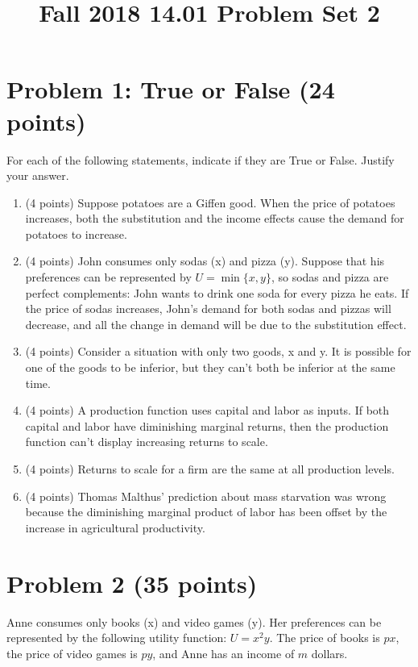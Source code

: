 \documentclass{article}
\begin{document}
\title{Fall 2018 14.01 Problem Set 2}
\maketitle

\section*{Problem 1: True or False (24 points)}
For each of the following statements, indicate if they are True or False. Justify your answer. 

\begin{enumerate}
    \item (4 points) Suppose potatoes are a Giﬀen good. When the price of potatoes increases, both the substitution and the income eﬀects cause the demand for potatoes to increase.
    \item (4 points) John consumes only sodas (x) and pizza (y). Suppose that his preferences can be represented by $U = \min \{x, y\}$, so sodas and pizza are perfect complements: John wants to drink one soda for every pizza he eats. If the price of sodas increases, John’s demand for both sodas and pizzas will decrease, and all the change in demand will be due to the substitution eﬀect.
    \item (4 points) Consider a situation with only two goods, x and y. It is possible for one of the goods to be inferior, but they can’t both be inferior at the same time.
    \item (4 points) A production function uses capital and labor as inputs. If both capital and labor have diminishing marginal returns, then the production function can’t display increasing returns to scale.
    \item (4 points) Returns to scale for a ﬁrm are the same at all production levels.
    \item (4 points) Thomas Malthus’ prediction about mass starvation was wrong because the diminishing marginal product of labor has been oﬀset by the increase in agricultural productivity.
\end{enumerate}

\section*{Problem 2 (35 points)}
Anne consumes only books (x) and video games (y). Her preferences can be represented by the following utility function: $U = x^2y$. The price of books is $px$, the price of video games is $py$, and Anne has an income of $m$ dollars. 
\end{document}

